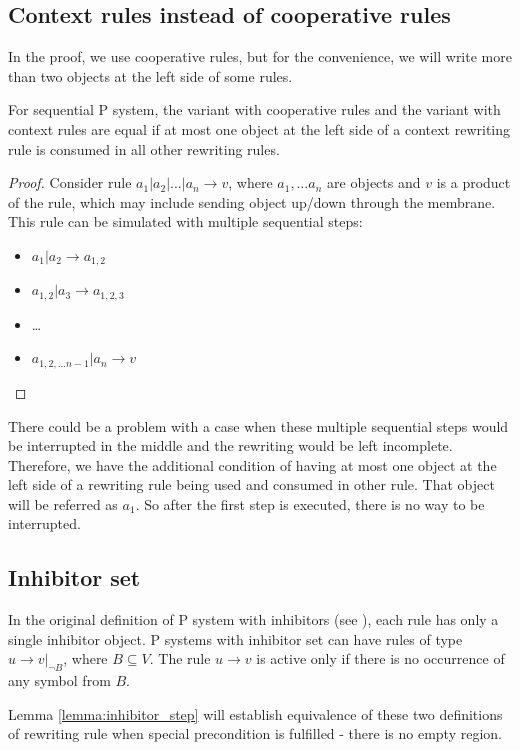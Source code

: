 \subsection{Context rules instead of cooperative rules}
  In the proof, we use cooperative rules, but for the convenience, we will write more than two objects at the left side of some rules.
  \begin{lemma}
  \label{lemma:context_rules}
    For sequential P system, the variant with cooperative rules and the variant with context rules are equal if at most one  object at the left side of a context rewriting rule is consumed in all other rewriting rules.
  \end{lemma}
  \begin{proof}
    Consider rule $a_1|a_2|\dots|a_n \rightarrow v$, where $a_1,\dots a_n$ are objects and $v$ is a product of the rule, which may include sending object up/down through the membrane.
    This rule can be simulated with multiple sequential steps:
    \begin{itemize}
      \item $a_1|a_2 \rightarrow a_{1,2}$
      \item $a_{1,2}|a_3 \rightarrow a_{1,2,3}$
      \item \dots
      \item $a_{1,2,\dots n-1}|a_n \rightarrow v$
    \end{itemize}    
  \end{proof}
  There could be a problem with a case when these multiple sequential steps would be interrupted in the middle and the rewriting would be left incomplete. Therefore, we have the additional condition of having at most one object at the left side of a rewriting rule being used and consumed in other rule. That object will be referred as $a_1$. So after the first step is executed, there is no way to be interrupted.

\subsection{Inhibitor set}
In the original definition of P system with inhibitors (see \cite{Ionescu:jucs_10_5:on_p_systems_with}), each rule has only a single inhibitor object. P systems with inhibitor set can have rules of type $u\rightarrow v|_{\neg B}$, where $B\subseteq V$. The rule $u\rightarrow v$ is active only if there is no occurrence of any symbol from $B$.

Lemma \ref{lemma:inhibitor_step} will establish equivalence of these two definitions of rewriting rule when special precondition is fulfilled - there is no empty region.

